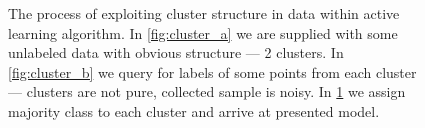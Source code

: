 \documentclass[12pt, a4paper, pdflatex]{report}
\begin{document}
\begin{figure}[htbp]
\begin{subfigure}[b]{0.3\textwidth}
    \caption{\label{fig:cluster_c}}
  \end{subfigure}
\begin{tiny}
\caption{The process of exploiting cluster structure in data within active learning algorithm. In \ref{fig:cluster_a} we are supplied with some unlabeled data with obvious structure --- 2 clusters. In \ref{fig:cluster_b} we query for labels of some points from each cluster --- clusters are not pure, collected sample is noisy. In \ref{fig:cluster_c} we assign majority class to each cluster and arrive at presented model.\label{fig:cluster}}
\end{tiny}
\vspace{1cm}
\end{figure}
\end{document}
